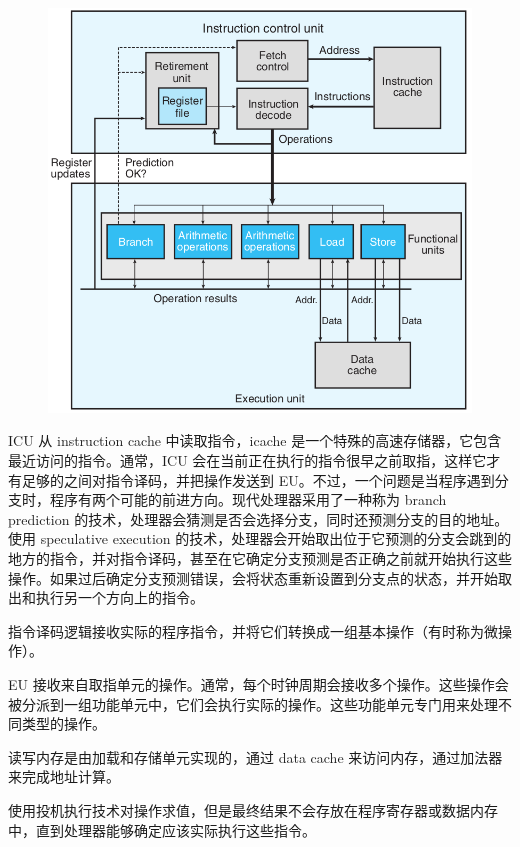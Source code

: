 \begin{figure}[!ht]
    \centering
    \includegraphics[scale=0.5]{img/5-1}
\end{figure}

ICU 从 instruction cache 中读取指令，icache 是一个特殊的高速存储器，它包含最近访问的指令。通常，ICU 会在当前正在执行的指令很早之前取指，这样它才有足够的之间对指令译码，并把操作发送到 EU。不过，一个问题是当程序遇到分支时，程序有两个可能的前进方向。现代处理器采用了一种称为 branch prediction 的技术，处理器会猜测是否会选择分支，同时还预测分支的目的地址。使用 speculative execution 的技术，处理器会开始取出位于它预测的分支会跳到的地方的指令，并对指令译码，甚至在它确定分支预测是否正确之前就开始执行这些操作。如果过后确定分支预测错误，会将状态重新设置到分支点的状态，并开始取出和执行另一个方向上的指令。

指令译码逻辑接收实际的程序指令，并将它们转换成一组基本操作（有时称为微操作）。

EU 接收来自取指单元的操作。通常，每个时钟周期会接收多个操作。这些操作会被分派到一组功能单元中，它们会执行实际的操作。这些功能单元专门用来处理不同类型的操作。

读写内存是由加载和存储单元实现的，通过 data cache 来访问内存，通过加法器来完成地址计算。

使用投机执行技术对操作求值，但是最终结果不会存放在程序寄存器或数据内存中，直到处理器能够确定应该实际执行这些指令。

